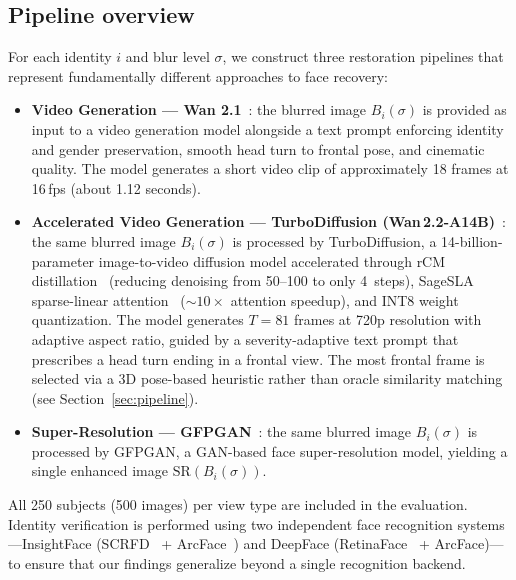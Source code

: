 \documentclass{ieeeaccess}
\begin{document}
\subsection{Pipeline overview}
For each identity $i$ and blur level $\sigma$, we construct three restoration pipelines that represent fundamentally different approaches to face recovery:

\begin{itemize}
    \item \textbf{Video Generation --- Wan 2.1}~\cite{Wan2_1}:\;
          the blurred image $B_i(\sigma)$ is provided as input to
          a video generation model alongside a text prompt enforcing
          identity and gender preservation, smooth head turn to
          frontal pose, and cinematic quality.  The model generates
          a short video clip of approximately 18 frames at 16\,fps
          (about 1.12 seconds).

    \item \textbf{Accelerated Video Generation --- TurboDiffusion
          (Wan\,2.2-A14B)}~\cite{TurboDiffusion}:\;
          the same blurred image $B_i(\sigma)$ is processed by
          TurboDiffusion, a 14-billion-parameter image-to-video
          diffusion model accelerated through rCM
          distillation~\cite{rCM} (reducing denoising from 50--100
          to only 4~steps), SageSLA sparse-linear
          attention~\cite{SLA} (${\sim}10\times$ attention speedup),
          and INT8 weight quantization.  The model generates
          $T = 81$ frames at 720p resolution with adaptive aspect
          ratio, guided by a severity-adaptive text prompt that
          prescribes a head turn ending in a frontal view.
          The most frontal frame is selected via a 3D pose-based
          heuristic rather than oracle similarity matching
          (see Section~\ref{sec:pipeline}).

    \item \textbf{Super-Resolution --- GFPGAN}~\cite{GFPGAN}:\;
          the same blurred image $B_i(\sigma)$ is processed by
          GFPGAN, a GAN-based face super-resolution model, yielding
          a single enhanced image $\text{SR}(B_i(\sigma))$.
\end{itemize}

All 250 subjects (500 images) per view type are included in the
evaluation.  Identity verification is performed using two
independent face recognition systems---InsightFace
(SCRFD~\cite{SCRFD} + ArcFace~\cite{ArcFace}) and DeepFace
(RetinaFace~\cite{RetinaFace} + ArcFace)---to ensure that our
findings generalize beyond a single recognition backend.
\end{document}
